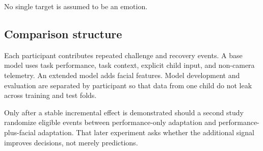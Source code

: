 No single target is assumed to be an emotion.

\subsection{Comparison structure}

Each participant contributes repeated challenge and recovery events. A base model uses task performance, task context, explicit child input, and non-camera telemetry. An extended model adds facial features. Model development and evaluation are separated by participant so that data from one child do not leak across training and test folds.

Only after a stable incremental effect is demonstrated should a second study randomize eligible events between performance-only adaptation and performance-plus-facial adaptation. That later experiment asks whether the additional signal improves decisions, not merely predictions.
